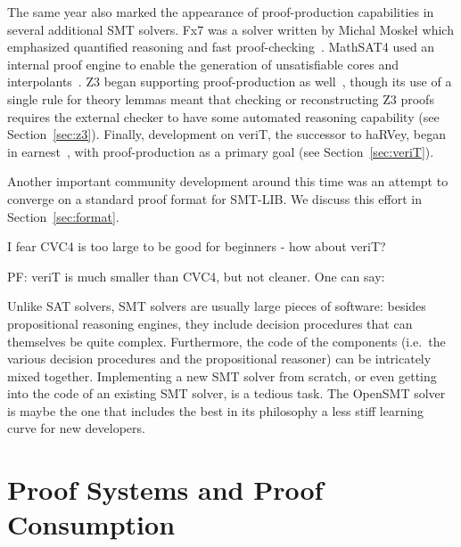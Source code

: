 \documentclass{llncs}
\begin{document}
The same year also marked the appearance of proof-production capabilities in
several additional SMT solvers.  Fx7 was a solver written by Michal Moske\l
which emphasized quantified reasoning and fast proof-checking~\cite{M08}.
MathSAT4 used an internal proof engine to enable the generation of
unsatisfiable cores and interpolants~\cite{BCF+08}.  Z3 began supporting
proof-production as well~\cite{dMB08}, though its use of a single rule for
theory lemmas meant that checking or reconstructing Z3 proofs requires the
external checker to have some automated reasoning capability (see
Section~\ref{sec:z3}).  Finally, development on veriT, the successor to haRVey,
began in earnest~\cite{BdOD+09}, with proof-production as a primary goal (see Section~\ref{sec:veriT}).

Another important community development around this time was an attempt to
converge on a standard proof format for SMT-LIB.  We discuss this effort in
Section~\ref{sec:format}.



I fear CVC4 is too large to be good for beginners - how about veriT?

PF: veriT is much smaller than CVC4, but not cleaner.  One can say:

Unlike SAT solvers, SMT solvers are usually large pieces of software: besides
propositional reasoning engines, they include decision procedures that can
themselves be quite complex.  Furthermore, the code of the components (i.e.\ the
various decision procedures and the propositional reasoner) can be intricately
mixed together.  Implementing a new SMT solver from scratch, or even getting
into the code of an existing SMT solver, is a tedious task.  The OpenSMT
solver~\cite{} is maybe the one that includes the best in its philosophy a less
stiff learning curve for new developers.

\section{Proof Systems and Proof Consumption}
\end{document}
